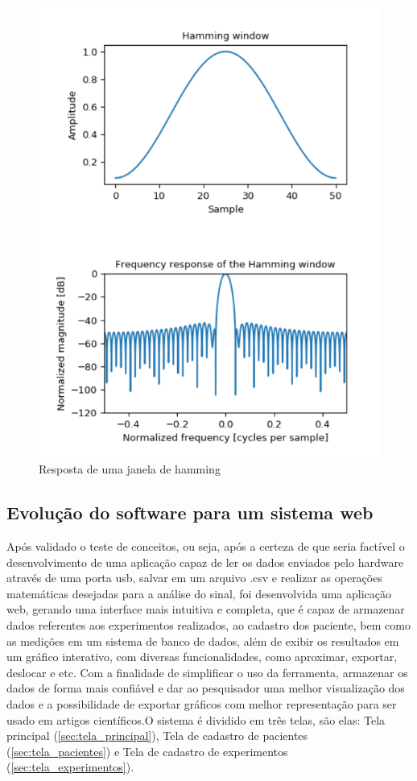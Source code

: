 \begin{figure}[h!]
	\begin{center}
		\includegraphics[width=1\linewidth]{images/janela_de_hamming.png}
		\caption{Resposta de uma janela de hamming}
		\label{fig:Janela_Hamming}
	\end{center}
\end{figure}

\subsection{Evolução do software para um sistema web}

Após validado o teste de conceitos, ou seja, após a certeza de que seria factível o desenvolvimento de uma aplicação capaz de ler os dados enviados pelo hardware através de uma porta usb, salvar em um arquivo .csv e realizar as operações matemáticas desejadas para a análise do sinal, foi desenvolvida uma aplicação web, gerando uma interface mais intuitiva e completa, que é capaz de armazenar dados referentes aos experimentos realizados, ao cadastro dos paciente, bem como as medições em um sistema de banco de dados, além de exibir os resultados em um gráfico interativo, com diversas funcionalidades, como aproximar, exportar, deslocar e etc. Com a finalidade de simplificar o uso da ferramenta, armazenar os dados de forma mais confiável e dar ao pesquisador uma melhor visualização dos dados e a possibilidade de exportar gráficos com melhor representação para ser usado em artigos científicos.O sistema é dividido em três telas, são elas: Tela principal (\ref{sec:tela_principal}), Tela de cadastro de pacientes (\ref{sec:tela_pacientes}) e Tela de cadastro de experimentos (\ref{sec:tela_experimentos}).

